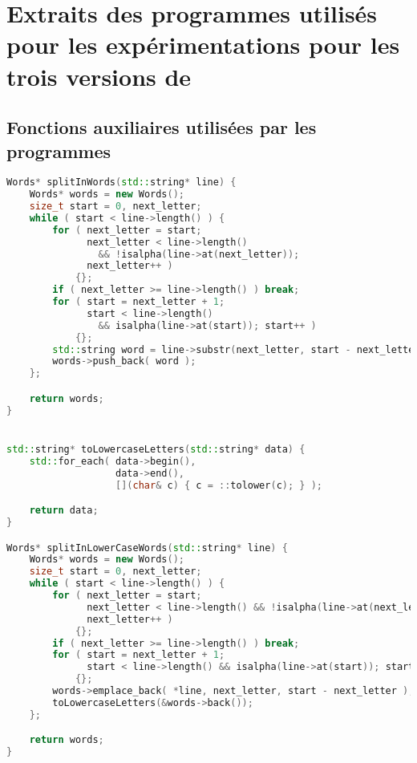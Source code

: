 \chapter{Extraits des programmes utilisés pour les expérimentations pour les trois versions de }
\label{appendice-code-wordcount-sf.ann}

\section{Fonctions auxiliaires utilisées par les programmes}

\begin{lstlisting}[basicstyle=\ttfamily\footnotesize,language=c++]
Words* splitInWords(std::string* line) {
    Words* words = new Words();
    size_t start = 0, next_letter;
    while ( start < line->length() ) {
        for ( next_letter = start;
              next_letter < line->length()
                && !isalpha(line->at(next_letter));
              next_letter++ )
            {};
        if ( next_letter >= line->length() ) break;
        for ( start = next_letter + 1;
              start < line->length()
                && isalpha(line->at(start)); start++ )
            {};
        std::string word = line->substr(next_letter, start - next_letter); 
        words->push_back( word );
    };

    return words;
}


std::string* toLowercaseLetters(std::string* data) {
    std::for_each( data->begin(),
                   data->end(),
                   [](char& c) { c = ::tolower(c); } );

    return data;
}

Words* splitInLowerCaseWords(std::string* line) {
    Words* words = new Words();
    size_t start = 0, next_letter;
    while ( start < line->length() ) {
        for ( next_letter = start;
              next_letter < line->length() && !isalpha(line->at(next_letter));
              next_letter++ )
            {};
        if ( next_letter >= line->length() ) break;
        for ( start = next_letter + 1;
              start < line->length() && isalpha(line->at(start)); start++ )
            {};
        words->emplace_back( *line, next_letter, start - next_letter );
        toLowercaseLetters(&words->back());
    };

    return words;
}
\end{lstlisting}


